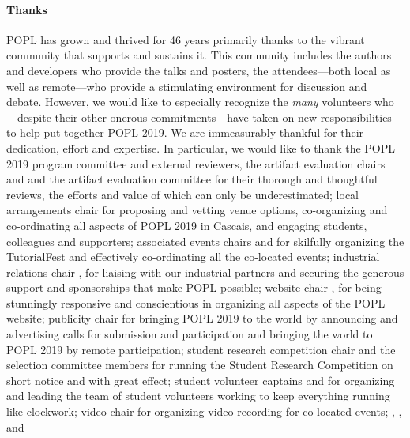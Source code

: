 \paragraph{Thanks}
%
POPL has grown and thrived for 46 years primarily thanks to
the vibrant community that supports and sustains it.
%
This community includes the authors and developers who
provide the talks and posters, the attendees---both local
as well as remote---who provide a stimulating environment
for discussion and debate.
%
However, we would like to especially recognize the \emph{many}
volunteers who---despite their other onerous commitments---have
taken on new responsibilities to help put together POPL 2019.
%
We are immeasurably thankful for their dedication, effort and expertise.
%
In particular, we would like to thank
%
the POPL 2019 program committee and external reviewers, 
%
the artifact evaluation chairs  and   
and the artifact evaluation committee for their
thorough and thoughtful reviews, the efforts and value of which can only be underestimated;
%
local arrangements chair  for proposing and vetting venue options, co-organizing and co-ordinating
all aspects of POPL 2019 in Cascais, and engaging students, colleagues and supporters;
%
associated events chairs  and  for skilfully organizing
the TutorialFest and effectively co-ordinating all the co-located events;
%
industrial relations chair , for liaising with our industrial
partners and securing the generous support and sponsorships that make POPL possible;
%
website chair , for being stunningly responsive 
and conscientious in organizing all aspects of the POPL website;
%
publicity chair  for bringing POPL 2019 to the world by announcing and advertising calls for
submission and participation and bringing the world to POPL 2019 by remote participation; 
%
student research competition chair  and the selection committee members for running the Student Research Competition on short notice and with great effect;
%
student volunteer captains  and  for organizing
and leading the team of student volunteers working to keep everything running like clockwork;
%
video chair  for organizing video recording for co-located events;
%
, ,
 and 
